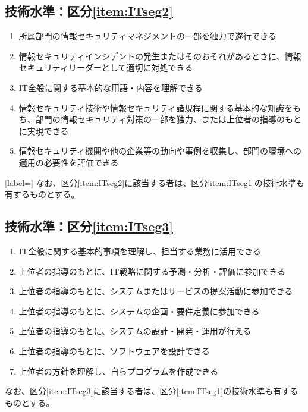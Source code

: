 \subsection{技術水準：区分\ref{item:ITseg2}}
\begin{enumerate}[label=\sarrow]
\item 所属部門の情報セキュリティマネジメントの一部を独力で遂行できる
\item {}情報セキュリティインシデントの発生またはそのおそれがあるときに、情報セキュリティリーダーとして適切に対処できる
\item IT全般に関する基本的な用語・内容を理解できる
\item 情報セキュリティ技術や情報セキュリティ諸規程に関する基本的な知識をもち、部門の情報セキュリティ対策の一部を独力、または上位者の指導のもとに実現できる
\item 情報セキュリティ機関や他の企業等の動向や事例を収集し、部門の環境への適用の必要性を評価できる
\end{enumerate}[label=\sarrow]
なお、区分\ref{item:ITseg2}\hx に該当する者は、区分\ref{item:ITseg1}\hx の技術水準も有するものとする。

\subsection{技術水準：区分\ref{item:ITseg3}}
\begin{enumerate}[label=\sarrow]
\item IT全般に関する基本的事項を理解し、担当する業務に活用できる
\item 上位者の指導のもとに、IT戦略に関する予測・分析・評価に参加できる
\item 上位者の指導のもとに、システムまたはサービスの提案活動に参加できる
\item 上位者の指導のもとに、システムの企画・要件定義に参加できる
\item 上位者の指導のもとに、システムの設計・開発・運用が行える
\item 上位者の指導のもとに、ソフトウェアを設計できる
\item 上位者の方針を理解し、自らプログラムを作成できる
\end{enumerate}
なお、区分\ref{item:ITseg3}\hx に該当する者は、区分\ref{item:ITseg1}\hx の技術水準も有するものとする。

